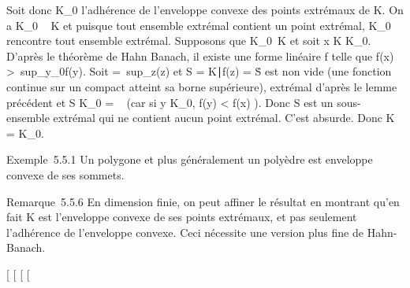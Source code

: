\documentclass[]{article}
\begin{document}
Soit donc K\_0 l'adhérence de l'enveloppe convexe des points
extrémaux de K. On a K\_0 \subset~ K et puisque tout ensemble extrémal
contient un point extrémal, K\_0 rencontre tout ensemble
extrémal. Supposons que K\_0\neq~K et
soit x \in K \diagdown K\_0. D'après le théorème de Hahn Banach, il existe
une forme linéaire f telle que f(x)
\textgreater{}\
sup\_y\inK\_0f(y). Soit \mu =\
sup\_z\inKf(z) et S = \z \in
K∣f(z) = \mu\. S est non vide
(une fonction continue sur un compact atteint sa borne supérieure),
extrémal d'après le lemme précédent et S \bigcap K\_0 = \varnothing~ (car si y \in
K\_0, f(y) \textless{} f(x) \leq \mu). Donc S est un sous-ensemble
extrémal qui ne contient aucun point extrémal. C'est absurde. Donc K =
K\_0.

Exemple~5.5.1 Un polygone et plus généralement un polyèdre est enveloppe
convexe de ses sommets.

Remarque~5.5.6 En dimension finie, on peut affiner le résultat en
montrant qu'en fait K est l'enveloppe convexe de ses points extrémaux,
et pas seulement l'adhérence de l'enveloppe convexe. Ceci nécessite une
version plus fine de Hahn-Banach.

{[}
{[}
{[}
{[}
\end{document}
